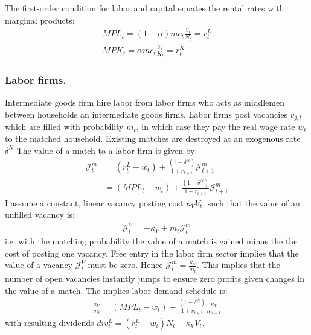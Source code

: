 The first-order condition for labor and capital equates the rental rates with marginal products:
\begin{gather}
MPL_{t}=\left(1-\alpha\right)mc_{t}\frac{Y_{t}}{N_{t}}=r_{t}^{L} \label{eq:labor_demand} \\
MPK_{t}=\alpha mc_{t}\frac{Y_{t}}{K_{t}}=r_{t}^{K} \label{eq:capital_demand} 
\end{gather}





\subsubsection*{Labor firms.}
Intermediate goods firm hire labor from labor firms who acts as middlemen between households an intermediate goods firms. Labor firms post vacancies $v_{j,t}$ which are filled with probability $m_t$, in which case they pay the real wage rate $w_t$ to the matched household. Existing matches are destroyed at an exogenous rate $\delta^N$
The value of a match to a labor firm is given by:
\begin{align*}
\mathcal{J}_{t}^{m}&=\left(r_{t}^{L}-w_{t}\right)+\frac{\left(1-\delta^{{N}}\right)}{1+r_{t+1}}\mathcal{J}_{t+1}^{m} \\
&=\left(MPL_{t}-w_{t}\right)+\frac{\left(1-\delta^{{N}}\right)}{1+r_{t+1}}\mathcal{J}_{t+1}^{m}
\end{align*}
I assume a constant, linear vacancy posting cost $\kappa_{V}V_{t}$, such that the value of an unfilled vacancy is:
\begin{gather*}
\mathcal{J}_{t}^{V}=-\kappa_{V}+m_{t}\mathcal{J}_{t}^{m}
\end{gather*}
i.e. with the matching probability the value of a match is gained minus the the cost of posting one vacancy. 
Free entry in the labor firm sector implies that the value of a vacancy $\mathcal{J}_{t}^{V}$ must be zero. Hence $\mathcal{J}_{t}^{m}=\frac{\kappa_{V}}{m_{t}}$. This implies that the number of open vacancies instantly jumps to ensure zero profits given changes in the value of a match. The implies labor demand schedule is:
\begin{gather}
\frac{\kappa_{V}}{m_{t}}=\left(MPL_{t}-w_{t}\right)+\frac{\left(1-\delta^{N}\right)}{1+r_{t+1}}\frac{\kappa_{V}}{m_{t+1}} \label{eq_labor_demand_sche}
\end{gather}
with resulting dividends $div_{t}^{L} = \left(r_{t}^{L}-w_{t}\right)N_{t}-\kappa_{V}V_{t}$.



